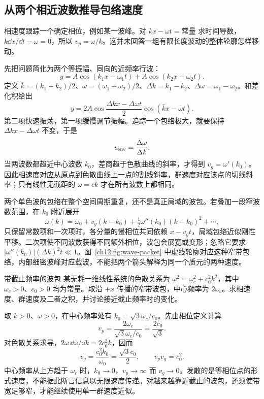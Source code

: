 \subsection{从两个相近波数推导包络速度}
相速度跟踪一个确定相位，例如某一波峰。对 $kx-\omega t=\text{常量}$ 求时间导数，$k\dd x/\dd t-\omega=0$，所以 $v_p=\omega/k$。这并未回答一组有限长度波动的整体轮廓怎样移动。

先把问题简化为两个等振幅、同向的近频率行波：
\[
 y=A\cos(k_1x-\omega_1t)+A\cos(k_2x-\omega_2t).
\]
定义 $\bar k=(k_1+k_2)/2$、$\bar\omega=(\omega_1+\omega_2)/2$、$\Delta k=k_1-k_2$、$\Delta\omega=\omega_1-\omega_2$。和差化积给出
\[
 y=2A\cos\frac{\Delta kx-\Delta\omega t}{2}
       \cos(\bar kx-\bar\omega t).
\]
第二项快速振荡，第一项缓慢调节振幅。追踪一个包络极大，就要保持 $\Delta kx-\Delta\omega t$ 不变，于是
\[
 v_{\rm env}=\frac{\Delta\omega}{\Delta k}.
\]
当两波数都趋近中心波数 $k_0$，差商趋于色散曲线的斜率，才得到 $v_g=\omega'(k_0)$。因此相速度对应从原点到色散曲线上一点的割线斜率，群速度对应该点的切线斜率；只有线性无截距的 $\omega=ck$ 才在所有波数上都相同。

两个单色波的包络在整个空间周期重复，还不是真正局域的波包。若叠加一段窄波数范围，在 $k_0$ 附近展开
\[
 \omega(k)=\omega_0+v_g(k-k_0)+\tfrac12\omega''(k_0)(k-k_0)^2+\cdots,
\]
只保留常数项和一次项时，各分量的慢相位共同依赖 $x-v_gt$，局域包络近似刚性平移。二次项使不同波数获得不同额外相位，波包会展宽或变形；忽略它要求 $|\omega''(k_0)|(\Delta k)^2t\ll1$。图~\ref{ch12:fig:wave-packet} 中虚线轮廓对应这种窄带包络，内部细密波峰对应载波，不能把两个箭头解释为同一个质元的两种速度。

\begin{origexamplebox}{带截止频率的波包}\label{ch12:ex:teaching-cutoff}
某无耗一维线性系统的色散关系为 $\omega^2=\omega_c^2+c_0^2k^2$，其中 $\omega_c>0$、$c_0>0$ 均为常量。取沿 $+x$ 传播的窄带波包，中心频率为 $2\omega_c$。求相速度、群速度及二者之积，并讨论接近截止频率时的变化。
\end{origexamplebox}
\begin{xesolution}
取 $k>0$、$\omega>0$，在中心频率处有 $k_0=\sqrt3\omega_c/c_0$。先由相位定义计算
\[
 v_p=\frac{2\omega_c}{\sqrt3\omega_c/c_0}=\frac{2c_0}{\sqrt3}.
\]
对色散关系求导，$2\omega\,\dd\omega/\dd k=2c_0^2k$，因而
\[
 v_g=\frac{c_0^2k_0}{\omega_0}=\frac{\sqrt3c_0}{2},
 \qquad v_pv_g=c_0^2.
\]
中心频率从上方趋于 $\omega_c$ 时，$k_0\to0$，$v_p\to\infty$ 而 $v_g\to0$。发散的是等相位点的形式速度，不能据此断言信息以无限速度传递。对越来越靠近截止的波包，还须使带宽足够窄，才能继续使用单一群速度近似。
\end{xesolution}
